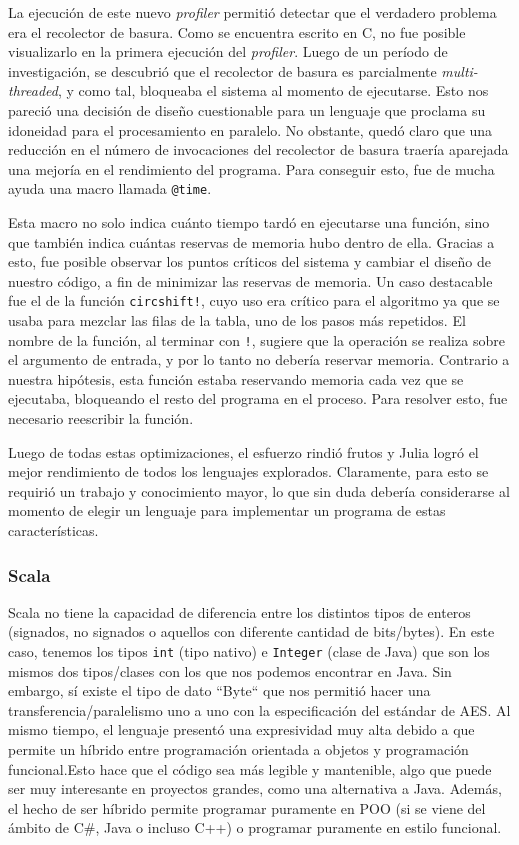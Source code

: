 \documentclass[11pt]{article}
\let\Oldsubsubsection\subsubsection
\renewcommand{\subsubsection}{\FloatBarrier\Oldsubsubsection}
\newcommand{\english}[1]{\textit{#1}}
\begin{document}
La ejecución de este nuevo \english{profiler} permitió detectar que el verdadero problema era el recolector de basura. Como se encuentra escrito en C, no fue posible visualizarlo en la primera ejecución del \english{profiler}. Luego de un período de investigación, se descubrió que el recolector de basura es parcialmente \english{multi-threaded}, y como tal, bloqueaba el sistema al momento de ejecutarse. Esto nos pareció una decisión de diseño cuestionable para un lenguaje que proclama su idoneidad para el procesamiento en paralelo. No obstante, quedó claro que una reducción en el número de invocaciones del recolector de basura traería aparejada una mejoría en el rendimiento del programa. Para conseguir esto, fue de mucha ayuda una macro llamada \lstinline{@time}.

Esta macro no solo indica cuánto tiempo tardó en ejecutarse una función, sino que también indica cuántas reservas de memoria hubo dentro de ella. Gracias a esto, fue posible observar los puntos críticos del sistema y cambiar el diseño de nuestro código, a fin de minimizar las reservas de memoria. Un caso destacable fue el de la función \lstinline{circshift!}, cuyo uso era crítico para el algoritmo ya que se usaba para mezclar las filas de la tabla, uno de los pasos más repetidos. El nombre de la función, al terminar con \lstinline{!}, sugiere que la operación se realiza sobre el argumento de entrada, y por lo tanto no debería reservar memoria. Contrario a nuestra hipótesis, esta función estaba reservando memoria cada vez que se ejecutaba, bloqueando el resto del programa en el proceso. Para resolver esto, fue necesario reescribir la función.

Luego de todas estas optimizaciones, el esfuerzo rindió frutos y Julia logró el mejor rendimiento de todos los lenguajes explorados. Claramente, para esto se requirió un trabajo y conocimiento mayor, lo que sin duda debería considerarse al momento de elegir un lenguaje para implementar un programa de estas características.

\subsubsection{Scala}

Scala no tiene la capacidad de diferencia entre los distintos tipos de enteros (signados, no signados o aquellos con diferente cantidad de bits/bytes). En este caso, tenemos los tipos \lstinline{int} (tipo nativo) e \lstinline{Integer} (clase de Java) que son los mismos dos tipos/clases con los que nos podemos encontrar en Java. Sin embargo, sí existe el tipo de dato ``Byte`` que nos permitió hacer una transferencia/paralelismo uno a uno con la especificación del estándar de AES. Al mismo tiempo, el lenguaje presentó una expresividad muy alta debido a que permite un híbrido entre programación orientada a objetos y programación funcional.Esto hace que el código sea más legible y mantenible, algo que puede ser muy interesante en proyectos grandes, como una alternativa a Java. Además, el hecho de ser híbrido permite programar puramente en POO (si se viene del ámbito de C\#, Java o incluso C++) o programar puramente en estilo funcional.
\end{document}
